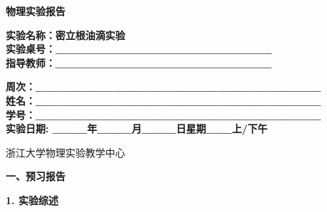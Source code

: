 \documentclass[a4paper,12pt]{article}
\begin{document}
\begin{center}
    \vspace*{2cm}
    {\fontsize{36pt}{43pt}\selectfont \textbf{物理实验报告}}
    \vspace{3cm}
\end{center}

\begin{center}
    \fontsize{16pt}{24pt}\selectfont
    \textbf{实验名称：密立根油滴实验\quad} \\[0.5em]
    \textbf{实验桌号：\_\_\_\_\_\_\_\_\_\_\_\_\_\_\_\_\_\_\_\_\_\_\_\_\_} \\[0.5em]
    \textbf{指导教师：\_\_\_\_\_\_\_\_\_\_\_\_\_\_\_\_\_\_\_\_\_\_\_\_\_}
\end{center}

\vspace{2cm}

\begin{center}
    \fontsize{14pt}{28pt}\selectfont
    \textbf{周次：\_\_\_\_\_\_\_\_\_\_\_\_\_\_\_\_\_\_\_\_\_\_\_\_\_\_\_\_\_\_\_\_\_} \\
    \textbf{姓名：\_\_\_\_\_\_\_\_\_\_\_\_\_\_\_\_\_\_\_\_\_\_\_\_\_\_\_\_\_\_\_\_\_} \\
    \textbf{学号：\_\_\_\_\_\_\_\_\_\_\_\_\_\_\_\_\_\_\_\_\_\_\_\_\_\_\_\_\_\_\_\_\_} \\[0.5em]
    \textbf{实验日期: \_\_\_\_年\_\_\_\_月\_\_\_\_日\quad 星期\_\_\_上/下午}
\end{center}

\vspace{1.5cm}

\begin{center}
    \fontsize{14pt}{20pt}\selectfont
    浙江大学物理实验教学中心
\end{center}

\newpage

{\fontsize{16pt}{24pt}\selectfont \textbf{一、预习报告}}

\vspace{0.5cm}
{\fontsize{14pt}{20pt}\selectfont \textbf{1. 实验综述}}

\vspace{0.3cm}
\end{document}
